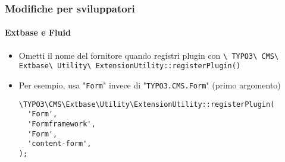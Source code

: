 \begin{frame}[fragile]
	\frametitle{Modifiche per sviluppatori}
	\framesubtitle{Extbase e Fluid}

	\lstset{basicstyle=\smaller\ttfamily}

	\begin{itemize}
		\item Ometti il nome del fornitore quando registri plugin con\newline
			\smaller
				\texttt{\textbackslash
					TYPO3\textbackslash
					CMS\textbackslash
					Extbase\textbackslash
					Utility\textbackslash
					ExtensionUtility::registerPlugin()}
			\normalsize

		\item Per esempio, usa "\texttt{Form}" invece di "\texttt{TYPO3.CMS.Form}"\newline
			\small(primo argomento)\normalsize

\begin{lstlisting}
\TYPO3\CMS\Extbase\Utility\ExtensionUtility::registerPlugin(
  'Form',
  'Formframework',
  'Form',
  'content-form',
);
\end{lstlisting}

	\end{itemize}

\end{frame}


